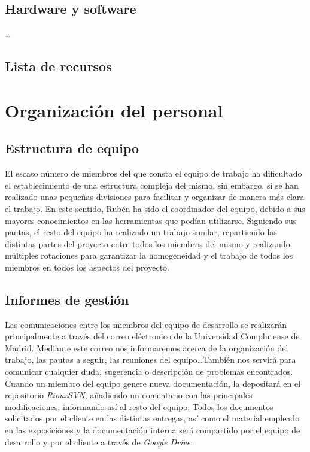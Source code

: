 \documentclass[11pt, a4paper, twoside]{report}
\begin{document}
		\subsection{Hardware y software}
			\ldots

		\subsection{Lista de recursos}
			

	\section{Organización del personal}
		\subsection{Estructura de equipo}	%
		El escaso número de miembros del que consta el equipo de trabajo ha dificultado el establecimiento de una estructura compleja del mismo, sin embargo, sí se han realizado unas pequeñas divisiones para facilitar y organizar de manera más clara el trabajo. En este sentido, Rubén ha sido el coordinador del equipo, debido a sus mayores conocimientos en las herramientas que podían utilizarse. Siguiendo sus pautas, el resto del equipo ha realizado un trabajo similar, repartiendo las distintas partes del proyecto entre todos los miembros del mismo y realizando múltiples rotaciones para garantizar la homogeneidad y el trabajo de todos los miembros en todos los aspectos del proyecto.
		\subsection{Informes de gestión}
		Las comunicaciones entre los miembros del equipo de desarrollo se realizarán principalmente a través del correo eléctronico de la Universidad Complutense de Madrid. Mediante este correo nos informaremos acerca de la organización del trabajo, las pautas a seguir, las reuniones del equipo\ldots También nos servirá para comunicar cualquier duda, sugerencia o descripción de problemas encontrados. \\
		Cuando un miembro del equipo genere nueva documentación, la depositará en el repositorio \textit{RiouxSVN}, añadiendo un comentario con las principales modificaciones, informando así al resto del equipo. Todos los documentos solicitados por el cliente en las distintas entregas, así como el material empleado en las exposiciones y la documentación interna será compartido por el equipo de desarrollo y por el cliente a través de  \textit{Google Drive}.
\end{document}
